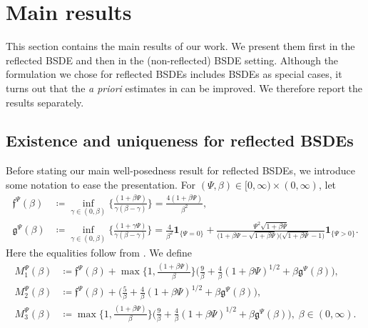 \documentclass[10pt]{article} %
\newcommand\ff{\mathfrak f}
\newcommand\fg{\mathfrak g}
\newcommand{\1}{\mathbf{1}}
\begin{document}
\section{Main results}\label{sec::main_results}

This section contains the main results of our work. We present them first in the reflected BSDE and then in the (non-reflected) BSDE setting. Although the formulation we chose for reflected BSDEs includes BSDEs as special cases, it turns out that the \emph{a priori} estimates in  can be improved. We therefore report the results separately.

\subsection{Existence and uniqueness for reflected BSDEs}\label{sec::main_results_rbsde}

Before stating our main well-posedness result for reflected BSDEs, we introduce some notation to ease the presentation. For $(\Psi,\beta) \in [0,\infty) \times (0,\infty)$, let
\begin{align*}
	\ff^\Psi(\beta) &\coloneqq \inf_{\gamma\in (0,\beta)} \bigg\{\frac{(1+\beta\Psi)}{\gamma(\beta-\gamma)}\bigg\} = \frac{4(1+\beta\Psi)}{\beta^2},\\
	\fg^\Psi(\beta) &\coloneqq \inf_{\gamma \in (0,\beta)} \bigg\{ \frac{(1+\gamma\Psi)}{\gamma(\beta-\gamma)}\bigg\} = \frac{4}{\beta^2}\1_{\{\Psi = 0\}} + \frac{\Psi^2  \sqrt{1+\beta\Psi}}{\big(1+\beta\Psi -\sqrt{1+\beta\Psi}\big)\big(\sqrt{1+\beta\Psi}-1\big)}\1_{\{\Psi > 0\}}.
\end{align*}
Here the equalities follow from . We define
\begin{align*}
	M_1^\Psi(\beta) &\coloneqq \ff^\Psi(\beta) + \max\bigg\{1,\frac{(1+\beta\Psi)}{\beta}\bigg\}\bigg(\frac{9}{\beta} +\frac{4}{\beta}(1+\beta\Psi)^{1/2} + \beta \fg^\Psi(\beta)\bigg),\\ M_2^\Psi (\beta)&\coloneqq \ff^\Psi(\beta) + \bigg( \frac{5}{\beta} + \frac{4}{\beta}(1+\beta\Psi)^{1/2} + \beta \fg^\Psi(\beta) \bigg), \\
	M_3^\Psi (\beta) &\coloneqq \max\bigg\{1,\frac{(1+\beta\Psi)}{\beta}\bigg\}\bigg(\frac{9}{\beta} +\frac{4}{\beta}(1+\beta\Psi)^{1/2} + \beta \fg^\Psi(\beta)\bigg),\; \beta \in (0,\infty).
\end{align*}
\end{document}
